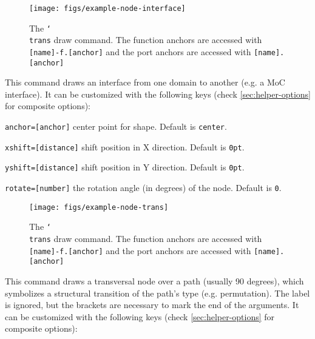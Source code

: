 \documentclass[10pt]{article}
\newenvironment{optionslist}[0]{ 
\begin{list}{}{
	\setlength{\itemindent}{-10pt}
	\setlength{\itemsep}{0pt}
	\setlength{\parsep}{0pt}
}}{\end{list}}
\newcommand\bookmark[1]{\marginpar{\ttfamily #1}}
\def\opt#1{\color{gray}{#1}}
\def\man#1{\color{black}{#1}}
\begin{document}
\begin{figure}[htb]\centering
\texttt{[image: figs/example-node-interface]}

\caption{The \texttt{\char`\\trans} draw command. The function anchors are accessed with \texttt{[name]-f.[anchor]} and the port anchors are accessed with \texttt{[name].[anchor]}}
\end{figure}
\hspace{1pt}\bookmark{\char`\\interface\opt{[options]}\opt{(name)}\opt{<position>}\man{\{domain~left\}}\man{\{domain~right\}};}

\noindent This command draws an interface from one domain to another (e.g. a MoC interface). It can be customized with the following keys (check \ref{sec:helper-options} for composite options):

\begin{optionslist}
\item \texttt{anchor=[anchor]} center point for shape. Default is \texttt{center}.
\item \texttt{xshift=[distance]} shift position in X direction. Default is \texttt{0pt}.
\item \texttt{yshift=[distance]} shift position in Y direction. Default is \texttt{0pt}.
\item \texttt{rotate=[number]} the rotation angle (in degrees) of the node. Default is \texttt{0}.
\end{optionslist}


\begin{figure}[htb]\centering
\texttt{[image: figs/example-node-trans]}

\caption{The \texttt{\char`\\trans} draw command. The function anchors are accessed with \texttt{[name]-f.[anchor]} and the port anchors are accessed with \texttt{[name].[anchor]}}
\end{figure}
\hspace{1pt}\bookmark{\char`\\trans\opt{[options]}\opt{(name)}\opt{<position>}\man{\{\}};}

\noindent This command draws a transversal node over a path (usually 90 degrees), which symbolizes a structural transition of the path's type (e.g. permutation). The label is ignored, but the brackets are necessary to mark the end of the arguments. It can be customized with the following keys (check \ref{sec:helper-options} for composite options):
\end{document}
